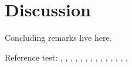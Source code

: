 \section{Discussion}
\label{sec:discussion}

Concluding remarks live here.

Reference test:
\cite{ArcherWest2003},
\cite{UNKNOWN},
\cite{ArcherWest2003},
\cite{BarrettJolleyetal2010},
\cite{Chaetal2009},
\cite{Chuetal2006},
\cite{Clarketal2011},
\cite{Halletal1996},
\cite{Horriganetal2002},
\cite{Lewisetal2011},
\cite{Maleckaretal2009},
\cite{Nygrenetal1998},
\cite{RadhakrishnanHindmarsh1993},
\cite{Tsugaetal2001},


